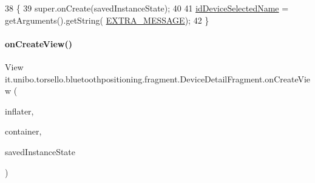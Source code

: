 \begin{DoxyCode}
38                                                     \{
39         super.onCreate(savedInstanceState);
40 
41         \hyperlink{classit_1_1unibo_1_1torsello_1_1bluetoothpositioning_1_1fragment_1_1DeviceDetailFragment_a6d52d8371a07fb8da75879758d1d6942_a6d52d8371a07fb8da75879758d1d6942}{idDeviceSelectedName} = getArguments().getString(
      \hyperlink{classit_1_1unibo_1_1torsello_1_1bluetoothpositioning_1_1fragment_1_1DeviceDetailFragment_a9f7fff4a2b22105976f2c7223d88f9ae_a9f7fff4a2b22105976f2c7223d88f9ae}{EXTRA\_MESSAGE});
42     \}
\end{DoxyCode}
\hypertarget{classit_1_1unibo_1_1torsello_1_1bluetoothpositioning_1_1fragment_1_1DeviceDetailFragment_a6d43be281b577e0d9f2540fea30c2fdf_a6d43be281b577e0d9f2540fea30c2fdf}{}\label{classit_1_1unibo_1_1torsello_1_1bluetoothpositioning_1_1fragment_1_1DeviceDetailFragment_a6d43be281b577e0d9f2540fea30c2fdf_a6d43be281b577e0d9f2540fea30c2fdf} 
\paragraph{\texorpdfstring{on\+Create\+View()}{onCreateView()}}
{\footnotesize\ttfamily View it.\+unibo.\+torsello.\+bluetoothpositioning.\+fragment.\+Device\+Detail\+Fragment.\+on\+Create\+View (\begin{DoxyParamCaption}\item[{Layout\+Inflater}]{inflater,  }\item[{View\+Group}]{container,  }\item[{Bundle}]{saved\+Instance\+State }\end{DoxyParamCaption})}



